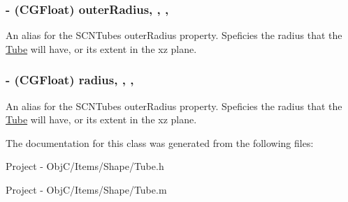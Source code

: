 \subsubsection[{outer\+Radius}]{\setlength{\rightskip}{0pt plus 5cm}-\/ (C\+G\+Float) outer\+Radius\hspace{0.3cm}{\ttfamily [read]}, {\ttfamily [write]}, {\ttfamily [nonatomic]}, {\ttfamily [assign]}}\label{interface_tube_a2ddbbdc8d3950c2f7ae89cc6ce8a0519}
An alias for the S\+C\+N\+Tube\textquotesingle{}s {\ttfamily outer\+Radius} property. Speficies the radius that the \hyperlink{interface_tube}{Tube} will have, or it\textquotesingle{}s extent in the {\ttfamily xz} plane. \hypertarget{interface_tube_a5ca82b412fe7dd377e2cb37bc433f21e}{}
\subsubsection[{radius}]{\setlength{\rightskip}{0pt plus 5cm}-\/ (C\+G\+Float) radius\hspace{0.3cm}{\ttfamily [read]}, {\ttfamily [write]}, {\ttfamily [nonatomic]}, {\ttfamily [assign]}}\label{interface_tube_a5ca82b412fe7dd377e2cb37bc433f21e}
An alias for the S\+C\+N\+Tube\textquotesingle{}s {\ttfamily outer\+Radius} property. Speficies the radius that the \hyperlink{interface_tube}{Tube} will have, or it\textquotesingle{}s extent in the {\ttfamily xz} plane. 

The documentation for this class was generated from the following files\+:\begin{DoxyCompactItemize}
\item 
Project -\/ Obj\+C/\+Items/\+Shape/Tube.\+h\item 
Project -\/ Obj\+C/\+Items/\+Shape/Tube.\+m\end{DoxyCompactItemize}
